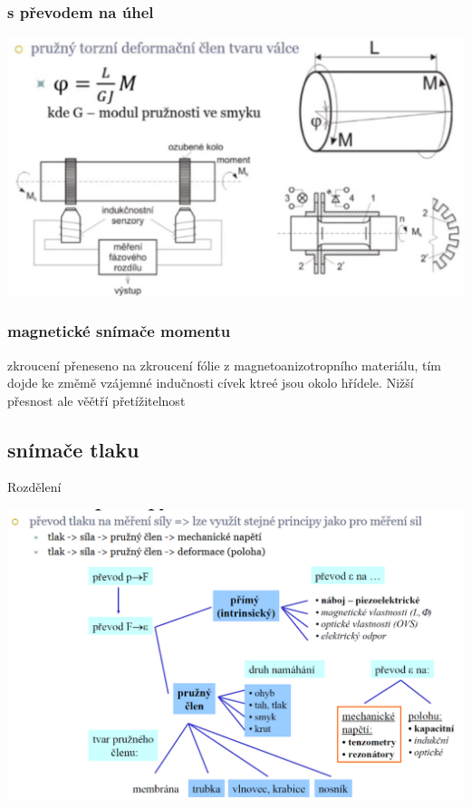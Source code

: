 \subsubsection*{s převodem na úhel}

\includegraphics*[scale= 0.2]{img/moment-uhel.png}

\subsubsection*{magnetické snímače momentu}
zkroucení přeneseno na zkroucení fólie z magnetoanizotropního materiálu, tím dojde ke změmě vzájemné indučnosti cívek ktreé jsou okolo hřídele.
Nižší přesnost ale věětří přetížitelnost

\subsection*{snímače tlaku}
Rozdělení

\includegraphics*[scale = 0.2]{img/tlak.png}

